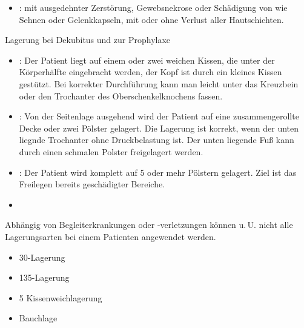 \documentclass[
ngerman,
paper=a4,
asymmetric,
fontsize=10pt,
headings=small,
draft=false,
numbers=noenddot,
bibtotocnumbered,
footnotes=multiple,
toc=flat,
]{scrreprt}
\begin{document}
\begin{enumerate}
{{{\begin{itemize}
  \item {}:  mit
  ausgedehnter Zerstörung, Gewebsnekrose oder Schädigung von
   wie
  Sehnen oder Gelenkkapseln, mit oder ohne Verlust aller
  Hautschichten.

\end{itemize}}}
{}
{}
{}
{}

\TextSlide
{Lagerung bei Dekubitus und zur Prophylaxe}
{
\begin{itemize}
  \item {}: Der Patient liegt auf
  einem oder zwei weichen Kissen, die unter der Körperhälfte
  eingebracht werden, der Kopf ist durch ein kleines Kissen
  gestützt. Bei korrekter Durchführung kann man leicht unter
  das Kreuzbein oder den Trochanter des Oberschenkelknochens
  fassen. \cite{ThiemesPflege12}
  \item {}: 
  Von der Seitenlage ausgehend wird der Patient auf eine
  zusammengerollte Decke oder zwei Pölster gelagert. Die
  Lagerung ist korrekt, wenn der unten liegnde Trochanter
  ohne Druckbelastung ist. Der unten liegende Fuß kann
  durch einen schmalen Polster freigelagert werden.
  \cite{WundversorgungPflege2}
  
  \item {}: Der Patient wird komplett
  auf 5 oder mehr Pölstern gelagert. Ziel ist das Freilegen
  bereits geschädigter Bereiche. \cite{ThiemesPflege12}
  \item {}
\end{itemize}

Abhängig von Begleiterkrankungen oder -verletzungen können
u.\,U. nicht alle Lagerungsarten bei einem Patienten
angewendet werden.
}
{
\begin{itemize}
  \item {30\textdegree{}-Lagerung}
  \item {135\textdegree{}-Lagerung}
  \item {5 Kissenweichlagerung}
  \item {Bauchlage}
\end{itemize}

 }
{}
{}
{}

}
\end{enumerate}
\end{document}
